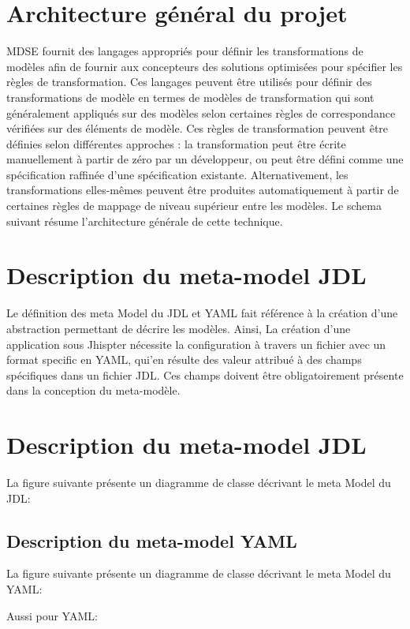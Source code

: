 \section{Architecture général du projet}

MDSE fournit des langages appropriés pour définir les transformations de
modèles afin de fournir aux concepteurs des solutions optimisées pour
spécifier les règles de transformation. Ces langages peuvent être
utilisés pour définir des transformations de modèle en termes de modèles
de transformation qui sont généralement appliqués sur des modèles selon
certaines règles de correspondance vérifiées sur des éléments de modèle.
Ces règles de transformation peuvent être définies selon différentes
approches : la transformation peut être écrite manuellement à partir de
zéro par un développeur, ou peut être défini comme une spécification
raffinée d'une spécification existante. Alternativement, les
transformations elles-mêmes peuvent être produites automatiquement à
partir de certaines règles de mappage de niveau supérieur entre les
modèles. Le schema suivant résume l'architecture générale de cette
technique.

\section{Description du meta-model JDL}

Le définition des meta Model du JDL et YAML fait référence à la création
d'une abstraction permettant de décrire les modèles. Ainsi, La création
d'une application sous Jhispter nécessite la configuration à 
travers un fichier avec un format specific en YAML, qui'en résulte
des valeur attribué à des champs spécifiques dans un fichier JDL. 
Ces champs doivent être obligatoirement présente dans la conception
du meta-modèle.

\section{Description du meta-model JDL}

La figure suivante présente un diagramme de classe décrivant 
le meta Model du JDL:

\begin{figure}[H]
  \begin{center}
      \caption{}
  \end{center}
\end{figure}

\subsection{Description du meta-model YAML}

La figure suivante présente un diagramme de classe décrivant 
le meta Model du YAML:

Aussi pour YAML:\\
\begin{figure}[H]
  \begin{center}
      \caption{}
  \end{center}
\end{figure}